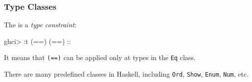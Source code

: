 \documentclass{beamer}
\begin{document}
\begin{frame}[fragile]
\frametitle{Type Classes}

The {\color{red}{following}} is a \emph{type constraint}:
\begin{hcode}
ghci> :t (==)  
(==) :: %
\end{hcode}

\vfill
It means that \verb+(==)+ can be applied only at types in the \verb+Eq+ class.

\vfill There are many predefined classes in Haskell, including
\verb+Ord+, \verb+Show+, \verb+Enum+, \verb+Num+, etc.

\end{frame}
\end{document}
